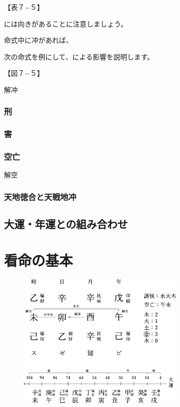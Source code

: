 \documentclass[a5paper,11pt,dvipdfmx]{tarticle}
\begin{document}
【表７−５】

には向きがあることに注意しましょう。

命式中に冲があれば、

次の命式を例にして、による影響を説明します。

【図７−５】


解冲


\subsubsection*{刑}


\subsubsection*{害}


\subsubsection*{空亡}


解空


\subsubsection*{天地徳合と天戦地冲}


\subsection{大運・年運との組み合わせ}



\clearpage




\section{看命の基本}

\begin{figure}[hbp]
  \includegraphics[width=82mm,angle=90]{figs/figure9-1.eps}
\end{figure}
\end{document}
